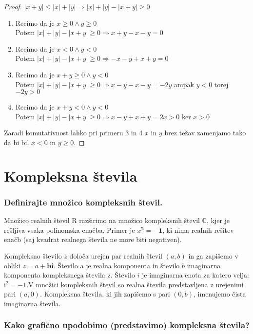 \documentclass{article}
\begin{document}
\begin{proof}
    $|x+y| \leq |x| + |y| \Rightarrow |x| + |y| - |x+y| \geq 0$
    \begin{enumerate}
        \item Recimo da je $x \geq 0 \land y \geq 0$ \\
        Potem $|x| + |y| - |x+y| \geq 0 \Rightarrow x + y - x - y = 0$
        \item Recimo da je $x < 0 \land y < 0$ \\
        Potem $|x| + |y| - |x+y| \geq 0 \Rightarrow -x -y +x + y = 0$
        \item Recimo da je $x+y \geq 0 \land y < 0$ \\
        Potem $|x| + |y| - |x+y| \geq 0 \Rightarrow x -y - x - y = -2y$ ampak $y < 0$ torej $-2y > 0$
        \item Recimo da je $x+y < 0 \land y < 0$ \\
        Potem $|x| + |y| - |x+y| \geq 0 \Rightarrow x -y + x + y = 2x > 0$ ker $x > 0$
    \end{enumerate}
    Zaradi komutativnost lahko pri primeru 3 in 4 $x$ in $y$ brez težav zamenjamo tako da bi bil $x < 0$ in $y \geq 0$. 
\end{proof}

\section{Kompleksna števila}
\subsubsection*{Definirajte množico kompleksnih števil.}

Množico realnih števil R razširimo na množico kompleksnih števil $\mathbb{C}$, kjer je rešljiva vsaka polinomska enačba. Primer je $x^{\mathbf{2}}=-\mathbf{1}$, ki nima realnih rešitev enačb (saj kvadrat realnega števila ne more biti negativen). 

Kompleksno število $z$ določa urejen par realnih števil $(a, b)$ in ga zapišemo v obliki $z=a+\mathbf{b i}$. Število a je realna komponenta in število $b$ imaginarna komponenta kompleksnega števila z. Število $i$ je imaginarna enota za katero velja: $\mathrm{i}^{2}=-1 . \mathrm{V}$ množici kompleksnih števil so realna števila predstavljena z urejenimi pari $(a, 0)$. Kompleksna števila, ki jih zapišemo s pari $(0, b)$, imenujemo čista imaginarna števila.

\subsubsection*{Kako grafično upodobimo (predstavimo) kompleksna števila?}
\end{document}
